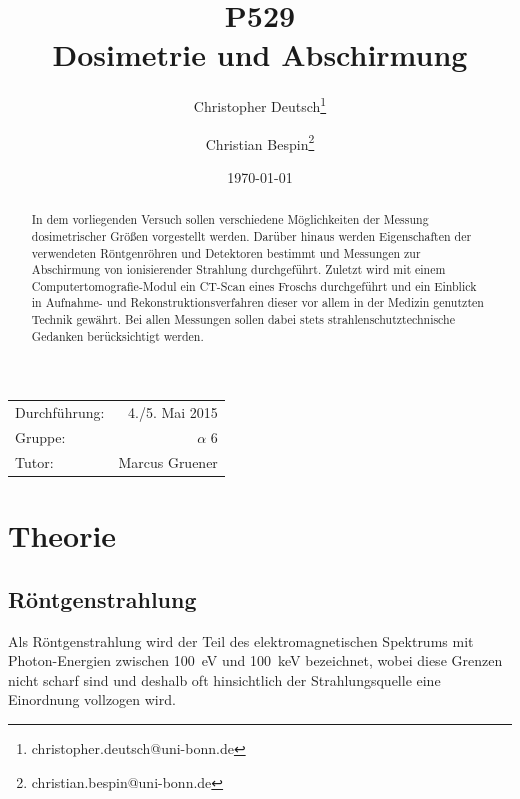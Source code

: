 \documentclass[11pt, a4paper]{article}
\title{P529 \\ Dosimetrie und Abschirmung}
\author{Christopher Deutsch\footnote{christopher.deutsch@uni-bonn.de} \and Christian Bespin\footnote{christian.bespin@uni-bonn.de}}
\date{\today}
\numberwithin{equation}{section}
\begin{document}
\begin{titlepage}

\maketitle

\begin{center}
\begin{tabular}{l r}
Durchführung: & 4./5. Mai 2015 \\
Gruppe: & $\alpha$ 6 \\
Tutor: & Marcus Gruener
\end{tabular}
\end{center}

\begin{abstract}
\noindent In dem vorliegenden Versuch sollen verschiedene Möglichkeiten der Messung dosimetrischer Größen vorgestellt werden.
Darüber hinaus werden Eigenschaften der verwendeten Röntgenröhren und Detektoren bestimmt und Messungen zur Abschirmung von ionisierender Strahlung durchgeführt.
Zuletzt wird mit einem Computertomografie-Modul ein CT-Scan eines Froschs durchgeführt und ein Einblick in Aufnahme- und Rekonstruktionsverfahren dieser vor allem in der Medizin genutzten Technik gewährt.
Bei allen Messungen sollen dabei stets strahlenschutztechnische Gedanken berücksichtigt werden.
\end{abstract}

\end{titlepage}

\tableofcontents
\newpage

\section{Theorie}
\subsection{Röntgenstrahlung}
Als Röntgenstrahlung wird der Teil des elektromagnetischen Spektrums mit Photon-Energien zwischen \SI{100}{\electronvolt} und \SI{100}{\kilo\electronvolt} bezeichnet, wobei diese Grenzen nicht scharf sind und deshalb oft hinsichtlich der Strahlungsquelle eine Einordnung vollzogen wird.
\end{document}
